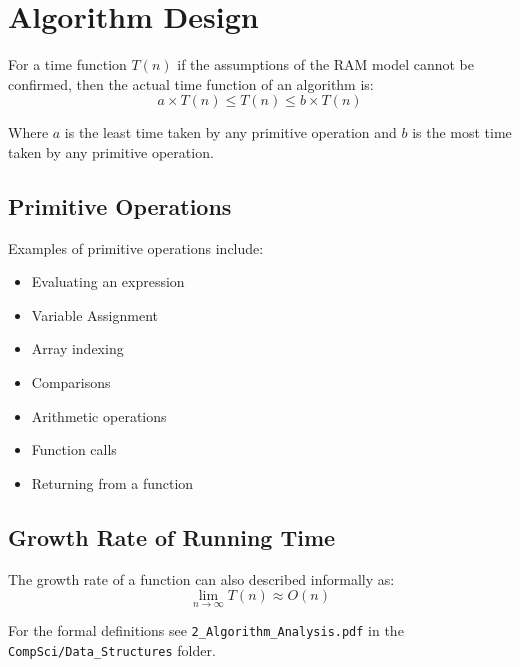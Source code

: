 \documentclass[12pt letter]{report}
\begin{document}
\chapter{Algorithm Design}

For a time function $T \left( n \right) $ if the assumptions of the RAM model cannot be confirmed, then the actual time
function of an algorithm is:
\[
  a \times  T \left( n \right)  \leq T \left( n \right)  \leq b \times T \left( n \right)
\]

\noindent Where $a$ is the least time taken by any primitive operation and $b$ is the most time taken by any primitive operation.

\section{Primitive Operations}


\noindent Examples of primitive operations include:
\begin{itemize}
  \item Evaluating an expression
  \item Variable Assignment
  \item Array indexing
  \item Comparisons
  \item Arithmetic operations
  \item Function calls
  \item Returning from a function
\end{itemize}

\section{Growth Rate of Running Time}

The growth rate of a function can also described informally as:
\[
  \lim_{n \to \infty} T \left( n \right) \approx O \left( n \right)
\]

\noindent For the formal definitions see \lstinline{2_Algorithm_Analysis.pdf} in the \lstinline{CompSci/Data_Structures} folder.
\end{document}
